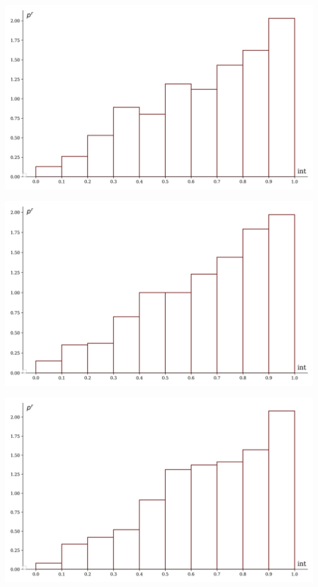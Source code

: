 \documentclass[a4paper, 14pt]{extarticle}
\begin{document}
\begin{minipage}[t]{0.25\textwidth}
  \includegraphics[width=\textwidth, height=\textheight, keepaspectratio]{sample5_hist}
\end{minipage}%
\begin{minipage}[t]{0.25\textwidth}
  \includegraphics[width=\textwidth, height=\textheight, keepaspectratio]{sample6_hist}
\end{minipage}%
\begin{minipage}[t]{0.25\textwidth}
  \includegraphics[width=\textwidth, height=\textheight, keepaspectratio]{sample7_hist}
\end{minipage}%
\end{document}
